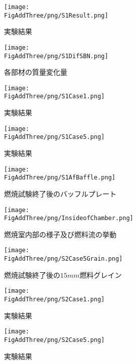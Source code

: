 \begin{figure}
\centering
\caption{実験結果}
\texttt{[image: \\FigAddThree/png/S1Result.png]}
\label{tab:S1Result}
\end{figure}

\begin{figure}
\centering
\caption{各部材の質量変化量}
\texttt{[image: \\FigAddThree/png/S1DifSBN.png]}
\label{tab:S1DifSBN}
\end{figure}

\begin{figure}
\centering
\texttt{[image: \\FigAddThree/png/S1Case1.png]}
\caption{実験結果}
\label{fig:S1Case1}
\end{figure}

\begin{figure}
\centering
\texttt{[image: \\FigAddThree/png/S1Case5.png]}
\caption{実験結果}
\label{fig:S1Case5}
\end{figure}

\begin{figure}
\centering
\texttt{[image: \\FigAddThree/png/S1AfBaffle.png]}
\caption{燃焼試験終了後のバッフルプレート}
\label{fig:S1AfBaffle}
\end{figure}

\begin{figure}
\centering
\texttt{[image: \\FigAddThree/png/InsideofChamber.png]}
\caption{燃焼室内部の様子及び燃料流の挙動}
\label{fig:InsideofChamber}
\end{figure}

\begin{figure}
\centering
\texttt{[image: \\FigAddThree/png/S2Case5Grain.png]}
\caption{燃焼試験終了後の$15mm$燃料グレイン}
\label{fig:S2Case5Grain}
\end{figure}

\begin{figure}
\centering
\texttt{[image: \\FigAddThree/png/S2Case1.png]}
\caption{実験結果}
\label{fig:S2Case1}
\end{figure}

\begin{figure}
\centering
\texttt{[image: \\FigAddThree/png/S2Case5.png]}
\caption{実験結果}
\label{fig:S1Case5}
\end{figure}
